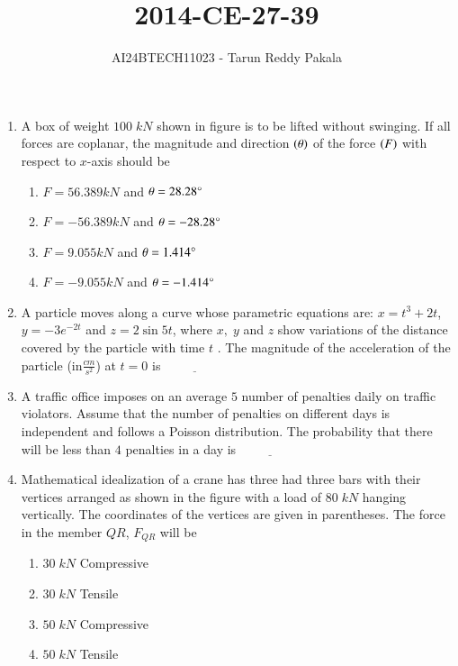 \documentclass[journal,12pt,onecolumn]{IEEEtran}
\title{2014-CE-27-39}
\author{AI24BTECH11023 - Tarun Reddy Pakala}
\theoremstyle{remark}
\begin{document}


\maketitle
\bigskip
\renewcommand{\thefigure}{\theenumi}
\renewcommand{\thetable}{\theenumi}
\begin{enumerate}[start=27]
\item A box of weight $100\;kN$ shown in figure is to be lifted without swinging. If all forces are coplanar, the magnitude and direction $\left(\theta\right)$ of the force $\left(F\right)$ with respect to $x$-axis should be
	
	\begin{enumerate}
    \item $F=56.389 kN$ and $\theta=28.28\degree$
    \item $F=-56.389 kN$ and $\theta=-28.28\degree$
    \item $F=9.055 kN$ and $\theta=1.414\degree$
    \item $F=-9.055 kN$ and $\theta=-1.414\degree$
\end{enumerate}
\item A particle moves along a curve whose parametric equations are: $x=t^3+2t$, $y=-3e^{-2t}$ and $z=2\sin{5t}$, where $x,\;y$ and $z$ show variations of the distance covered by the particle  with time $t$ . The magnitude of the acceleration of the particle  ({in}\;$\frac{cm}{s^2}$) at $t=0$ is $\underline{\hspace{2cm}}$
\item A traffic office imposes on an average $5$ number of penalties  daily on traffic violators. Assume that the number of penalties on different days is independent and follows a Poisson distribution. The probability that there will be less than $4$ penalties in a day is $\underline{\hspace{2cm}}$
\item Mathematical idealization of a crane has three had three bars with their vertices arranged as shown in the figure with a load of $80\;kN$ hanging vertically. The coordinates of the vertices are given in parentheses. The force in the member $QR$, $F_{QR}$ will be 
	
\begin{enumerate}
    \item $30\;kN$ Compressive
    \item $30\;kN$ Tensile
    \item $50\;kN$ Compressive
    \item $50\;kN$ Tensile

\end{enumerate}
\end{enumerate}
\end{document}
